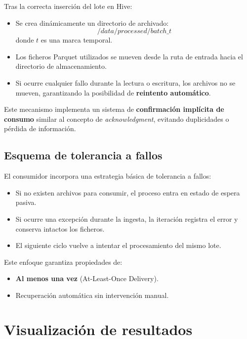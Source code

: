 \documentclass[12pt,a4paper]{article}
\begin{document}
	Tras la correcta inserción del lote en Hive:
	
	\begin{itemize}
		\item Se crea dinámicamente un directorio de archivado:
		\[
		/data/processed/batch\_t
		\]
		donde $t$ es una marca temporal.
		\item Los ficheros Parquet utilizados se mueven desde la ruta de entrada hacia el directorio de almacenamiento.
		\item Si ocurre cualquier fallo durante la lectura o escritura, los archivos no se mueven, garantizando la posibilidad de \textbf{reintento automático}.
	\end{itemize}
	
	Este mecanismo implementa un sistema de \textbf{confirmación implícita de consumo} similar al concepto de \textit{acknowledgment}, evitando duplicidades o pérdida de información.
	
	\subsection{Esquema de tolerancia a fallos}
	
	El consumidor incorpora una estrategia básica de tolerancia a fallos:
	
	\begin{itemize}
		\item Si no existen archivos para consumir, el proceso entra en estado de espera pasiva.
		\item Si ocurre una excepción durante la ingesta, la iteración registra el error y conserva intactos los ficheros.
		\item El siguiente ciclo vuelve a intentar el procesamiento del mismo lote.
	\end{itemize}
	
	Este enfoque garantiza propiedades de:
	
	\begin{itemize}
		\item \textbf{Al menos una vez} (At-Least-Once Delivery).
		\item Recuperación automática sin intervención manual.
	\end{itemize}
	
	\textbf{}
	
	
	
	
	
	
	\section{Visualización de resultados}
	
\end{document}
